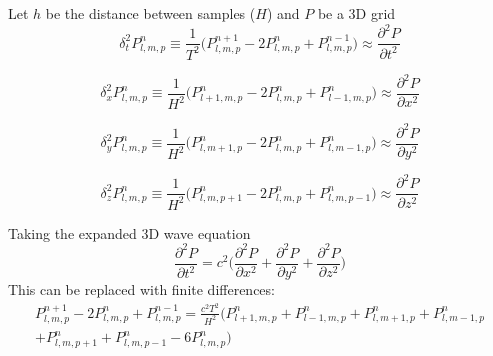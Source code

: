 \documentclass{beamer}
\begin{document}
\begin{frame}
	Let $h$ be the distance between samples ($H$) and $P$ be a 3D grid
	\begin{equation}
		\label{equation:part1}
		\delta_{t}^{2} P_{l,m,p}^{n} \equiv \frac{1}{T^{2}} \Big(P_{l,m,p}^{n+1} - 2 P_{l,m,p}^{n} + P_{l,m,p}^{n-1}\Big) \approx \frac{{\partial ^2 P}}{{\partial t^2 }}
	\end{equation}
	
	\begin{equation}
		\label{equation:part2}
		\delta_{x}^{2} P_{l,m,p}^{n} \equiv \frac{1}{H^{2}} \Big(P_{l+1,m,p}^{n} - 2 P_{l,m,p}^{n} + P_{l-1,m,p}^{n}\Big) \approx \frac{{\partial ^2 P}}{{\partial x^2 }}
	\end{equation}
	
	\begin{equation}
		\label{equation:part3}
		\delta_{y}^{2} P_{l,m,p}^{n} \equiv \frac{1}{H^{2}} \Big(P_{l,m+1,p}^{n} - 2 P_{l,m,p}^{n} + P_{l,m-1,p}^{n}\Big) \approx \frac{{\partial ^2 P}}{{\partial y^2 }}
	\end{equation}
	
	\begin{equation}
		\label{equation:part4}
		\delta_{z}^{2} P_{l,m,p}^{n} \equiv \frac{1}{H^{2}} \Big(P_{l,m,p+1}^{n} - 2 P_{l,m,p}^{n} + P_{l,m,p-1}^{n}\Big) \approx \frac{{\partial ^2 P}}{{\partial z^2 }}
	\end{equation}
\end{frame}


\begin{frame}

Taking the expanded 3D wave equation
	\begin{equation}
		\label{equation:wave-expanded}
		\frac{{\partial ^2 P}}{{\partial t^2 }} = c^2 \Bigg( \frac{\partial ^2 P}{\partial x^2 } + \frac{\partial ^2 P}{\partial y^2 }  + \frac{\partial ^2 P}{\partial z^2 } \Bigg)
	\end{equation}
	This can be replaced with finite differences:
	\small
	\begin{multline}
		\label{equation:stencil-big}
		P_{l,m,p}^{n+1} - 2 P_{l,m,p}^{n} + P_{l,m,p}^{n-1} = \frac{c^2 T^2}{H^2} \big(P_{l+1,m,p}^{n} + P_{l-1,m,p}^{n} + P_{l,m+1,p}^{n} + P_{l,m-1,p}^{n} \\ 
		+ P_{l,m,p+1}^{n} + P_{l,m,p-1}^{n} - 6 P_{l,m,p}^{n} \big)
	\end{multline}
\end{frame}
\end{document}

